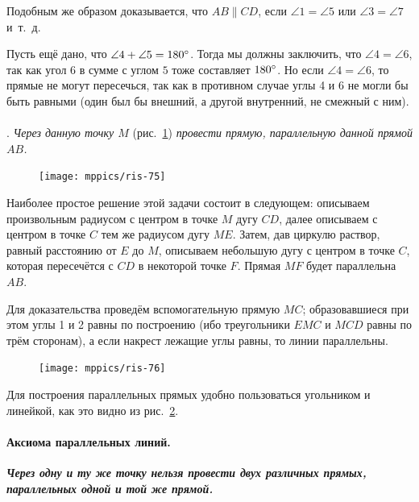 \documentclass[oneside]{book}
\begin{document}
Подобным же образом доказывается, что $AB \parallel CD$, если $\angle 1 = \angle 5$ или $\angle 3 = \angle 7$ и~т.~д.

Пусть ещё дано, что $\angle 4 + \angle 5 = 180\degree$.
Тогда мы должны заключить, что $\angle 4 = \angle 6$, так как угол $6$ в сумме с углом $5$ тоже составляет $180\degree$.
Но если $\angle 4 = \angle 6$, то прямые не могут пересечься, так как в противном случае углы 4 и 6 не могли бы быть равными (один был бы внешний, а другой внутренний, не смежный с ним).

\paragraph{}\label{1938/74}
.
\emph{Через данную точку $M$} (рис.~\ref{1938/ris-75}) \emph{провести прямую, параллельную данной прямой $AB$.}

\begin{figure}
\centering
\texttt{[image: mppics/ris-75]}
\caption{}\label{1938/ris-75}
\end{figure}


Наиболее простое решение этой задачи состоит в следующем:
описываем произвольным радиусом с центром в точке $M$ дугу $CD$, далее описываем с центром в точке $C$ тем же радиусом дугу $ME$.
Затем, дав циркулю раствор, равный расстоянию от $E$ до $M$, описываем небольшую дугу с центром в точке $C$, которая пересечётся с $CD$ в некоторой точке $F$.
Прямая $MF$ будет параллельна $AB$.

Для доказательства проведём вспомогательную прямую $MC$;
образовавшиеся при этом углы 1 и 2 равны по построению (ибо треугольники $EMC$ и $MCD$ равны по трём сторонам), а если накрест лежащие углы равны, то линии параллельны.

\begin{figure}[h!]
\centering
\texttt{[image: mppics/ris-76]}
\caption{}\label{1938/ris-76}
\end{figure}

Для построения параллельных прямых удобно пользоваться угольником и линейкой, как это видно из рис.~\ref{1938/ris-76}.

\paragraph{Аксиома параллельных линий.}\label{1938/75}
\textbf{\emph{Через одну и ту же точку нельзя провести двух различных прямых, параллельных одной и той же прямой.}}
\end{document}
